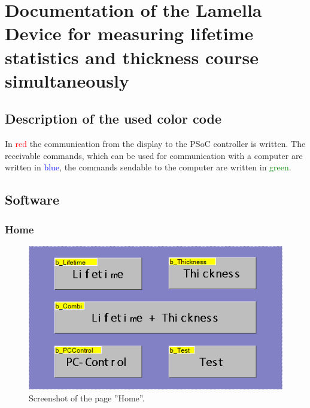 
	\chapter{Documentation of the Lamella Device for measuring lifetime statistics and thickness course simultaneously}
	
	\section{Description of the used color code}
	In \textcolor{red}{red} the communication from the display to the PSoC controller is written. 
	The receivable commands, which can be used for communication with a computer are written in \textcolor{blue}{blue}, the commands sendable to the computer are written in \textcolor{green}{green}.
	
	
%	
	
	
	\section{Software}

	\subsection{Home}
	\begin{figure}[h]
		\centering
		\includegraphics[width=0.7\linewidth]{LamellaDevice_Hardware/HomePage}
		\caption{Screenshot of the page ''Home''.}
		\label{fig:homepage}
	\end{figure}

